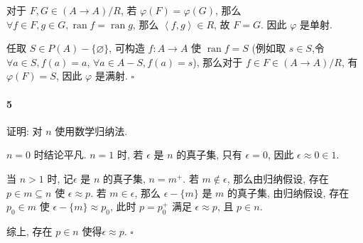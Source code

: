 \documentclass{ctexart}
\def\QED{\hfill $\square$}
\def\pair#1{\left\langle #1 \right\rangle}
\DeclareMathOperator{\ran}{ran}
\begin{document}
对于 $F, G\in (A\mathop{\to} A)/R$, 若 $\varphi(F)=\varphi(G)$, 
那么 $\forall f\in F, g\in G, \ran f = \ran g$, 那么 $\pair{f,g} \in R$,
故 $F=G$. 因此 $\varphi$ 是单射.

任取 $S \in P(A)-\{\varnothing\}$, 可构造 $f:A\to A$ 使 $\ran f=S$
(例如取 $s\in S$,令 $\forall a\in S, f(a)=a$,
$\forall a \in A-S, f(a)=s$), 那么对于 $f\in F\in (A\mathop{\to} A)/R$,
有 $\varphi(F)=S$, 因此 $\varphi$ 是满射. \QED

\paragraph*{5} 证明: 对 $n$ 使用数学归纳法.

$n=0$ 时结论平凡. $n=1$ 时, 若 $\epsilon$ 是 $n$ 的真子集, 只有 $\epsilon=0$, 
因此 $\epsilon \approx 0 \in 1$.

当 $n>1$ 时, 记$\epsilon$ 是 $n$ 的真子集, $n=m^+$. 若 $m\notin \epsilon$, 
那么由归纳假设, 存在 $p\in m\subseteq n$ 使 $\epsilon \approx p$.
若 $m\in \epsilon$, 那么 $\epsilon-\{m\}$ 是 $m$ 的真子集,
由归纳假设, 存在 $p_0\in m$ 使 $\epsilon-\{m\} \approx p_0$,
此时 $p=p_0^+$ 满足 $\epsilon \approx p$, 且 $p\in n$.

综上, 存在 $p\in n$ 使得$\epsilon \approx p$. \QED

\end{document}
